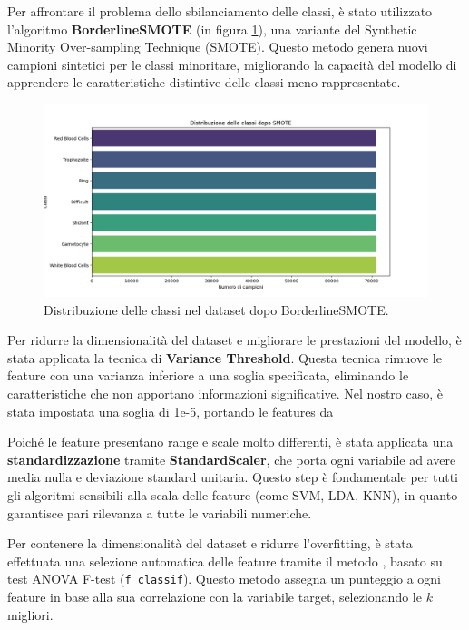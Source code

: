 \documentclass[minted, draw]{../tex/hebdomon}
\begin{document}
Per affrontare il problema dello sbilanciamento delle classi, è stato utilizzato l'algoritmo \textbf{BorderlineSMOTE} (in figura \ref{fig:BorderlineSMOTE}), una variante del Synthetic Minority Over-sampling Technique (SMOTE). Questo metodo genera nuovi campioni sintetici per le classi minoritare, migliorando la capacità del modello di apprendere le caratteristiche distintive delle classi meno rappresentate.
% 
\begin{figure}[H]
  \centering
  \includegraphics[width=.9\linewidth]{figures/class_distribution_after_smote.png}
  \caption{Distribuzione delle classi nel dataset dopo BorderlineSMOTE.}
  \label{fig:BorderlineSMOTE}
\end{figure}
%

Per ridurre la dimensionalità del dataset e migliorare le prestazioni del modello, è stata applicata la tecnica di \textbf{Variance Threshold}. Questa tecnica rimuove le feature con una varianza inferiore a una soglia specificata, eliminando le caratteristiche che non apportano informazioni significative. Nel nostro caso, è stata impostata una soglia di 1e-5, portando le features da 

Poiché le feature presentano range e scale molto differenti, è stata applicata una \textbf{standardizzazione} tramite \textbf{StandardScaler}, che porta ogni variabile ad avere media nulla e deviazione standard unitaria. Questo step è fondamentale per tutti gli algoritmi sensibili alla scala delle feature (come SVM, LDA, KNN), in quanto garantisce pari rilevanza a tutte le variabili numeriche.


Per contenere la dimensionalità del dataset e ridurre l’overfitting, è stata effettuata una selezione automatica delle feature tramite il metodo , basato su test ANOVA F-test (\texttt{f\_classif}). Questo metodo assegna un punteggio a ogni feature in base alla sua correlazione con la variabile target, selezionando le $k$ migliori.
\end{document}
